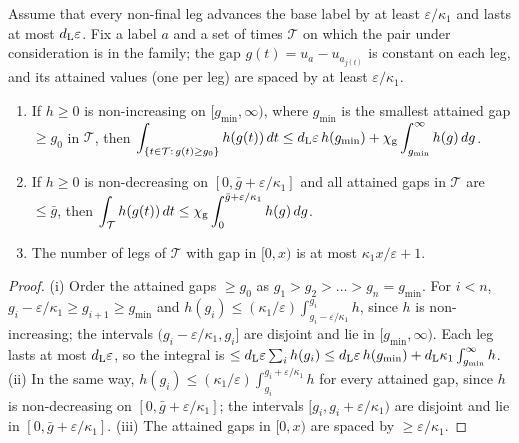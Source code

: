 \begin{lemma}\label{lem:Estar-gap}
Assume that every non-final leg advances the base label by at least $\varepsilon/\kappa_1$ and lasts at most $d_{\mathrm L}\varepsilon$. Fix a
label $a$ and a set of times $\mathcal T$ on which the pair under consideration is in the family; the gap
$g(t)=u_a-u_{a_{j(t)}}$ is constant on each leg, and its attained values (one per leg) are spaced by at least $\varepsilon/\kappa_1$.
\begin{enumerate}
\item[(i)] If $h\ge0$ is non-increasing on $[g_{\min},\infty)$, where $g_{\min}$ is the smallest attained gap $\ge g_0$ in
$\mathcal T$, then
$\displaystyle\int_{\{t\in\mathcal T:\,g(t)\ge g_0\}}h(g(t))\,dt\le d_{\mathrm L}\varepsilon\,h(g_{\min})+\chi_{\mathrm g}\int_{g_{\min}}^\infty h(g)\,dg$.
\item[(ii)] If $h\ge0$ is non-decreasing on $[0,\bar g+\varepsilon/\kappa_1]$ and all attained gaps in $\mathcal T$ are
$\le\bar g$, then $\displaystyle\int_{\mathcal T}h(g(t))\,dt\le\chi_{\mathrm g}\int_0^{\bar g+\varepsilon/\kappa_1}h(g)\,dg$.
\item[(iii)] The number of legs of $\mathcal T$ with gap in $[0,x)$ is at most $\kappa_1x/\varepsilon+1$.
\end{enumerate}
\end{lemma}
\begin{proof}
(i) Order the attained gaps $\ge g_0$ as $g_1>g_2>\dots>g_n=g_{\min}$. For $i<n$, $g_i-\varepsilon/\kappa_1\ge g_{i+1}\ge g_{\min}$
and $h(g_i)\le(\kappa_1/\varepsilon)\int_{g_i-\varepsilon/\kappa_1}^{g_i}h$, since $h$ is non-increasing; the intervals
$(g_i-\varepsilon/\kappa_1,g_i]$ are disjoint and lie in $[g_{\min},\infty)$. Each leg lasts at most $d_{\mathrm L}\varepsilon$, so the integral
is $\le d_{\mathrm L}\varepsilon\sum_ih(g_i)\le d_{\mathrm L}\varepsilon\,h(g_{\min})+d_{\mathrm L}\kappa_1\int_{g_{\min}}^\infty h$.
(ii) In the same way, $h(g_i)\le(\kappa_1/\varepsilon)\int_{g_i}^{g_i+\varepsilon/\kappa_1}h$ for every attained gap, since $h$ is
non-decreasing on $[0,\bar g+\varepsilon/\kappa_1]$; the intervals $[g_i,g_i+\varepsilon/\kappa_1)$ are disjoint and lie in
$[0,\bar g+\varepsilon/\kappa_1]$. (iii) The attained gaps in $[0,x)$ are spaced by $\ge\varepsilon/\kappa_1$.
\end{proof}

